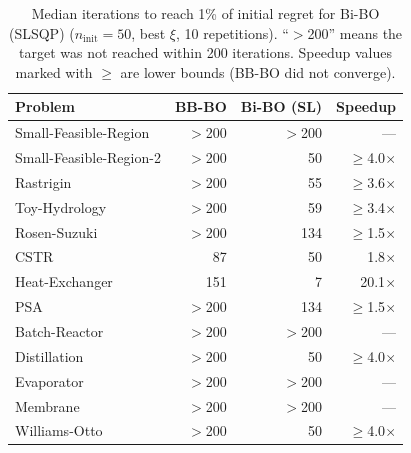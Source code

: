 \documentclass[12pt,a4paper]{article}%
\theoremstyle{plain}%
\theoremstyle{remark}%
\theoremstyle{definition}%
\begin{document}
\begin{appendices}
\begin{table}[htbp]
\centering
\caption{Median iterations to reach 1\% of initial regret for Bi-BO (SLSQP) ($n_\text{init}=50$, best $\xi$, 10 repetitions). ``$>$200'' means the target was not reached within 200 iterations. Speedup values marked with $\geq$ are lower bounds (BB-BO did not converge).}
\label{tab:convergence_speed}
\begin{tabular}{@{}lrrr@{}}
\toprule
\textbf{Problem} & \textbf{BB-BO} & \textbf{Bi-BO (SL)} & \textbf{Speedup} \\
\midrule
Small-Feasible-Region   & $>$200 & $>$200 & ---       \\
Small-Feasible-Region-2 & $>$200 & 50     & $\geq$4.0$\times$  \\
Rastrigin               & $>$200 & 55     & $\geq$3.6$\times$  \\
Toy-Hydrology           & $>$200 & 59     & $\geq$3.4$\times$  \\
Rosen-Suzuki            & $>$200 & 134    & $\geq$1.5$\times$  \\
\midrule
CSTR                    & 87     & 50     & 1.8$\times$  \\
Heat-Exchanger          & 151    & 7      & 20.1$\times$ \\
PSA                     & $>$200 & 134    & $\geq$1.5$\times$  \\
Batch-Reactor           & $>$200 & $>$200 & ---       \\
Distillation            & $>$200 & 50     & $\geq$4.0$\times$  \\
Evaporator              & $>$200 & $>$200 & ---       \\
Membrane                & $>$200 & $>$200 & ---       \\
Williams-Otto           & $>$200 & 50     & $\geq$4.0$\times$  \\
\bottomrule
\end{tabular}
\end{table}


\end{appendices}
\end{document}
